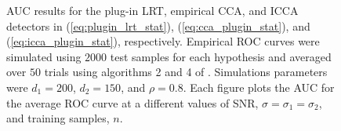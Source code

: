 \begin{figure}
{    \label{fig:auc_icca_high_rho}
  }
  \caption{AUC results for the plug-in LRT, empirical CCA, and ICCA detectors in
    (\ref{eq:plugin_lrt_stat}), (\ref{eq:cca_plugin_stat}), and
    (\ref{eq:icca_plugin_stat}), respectively. Empirical ROC curves were simulated using
    $2000$ test samples for each hypothesis and averaged over $50$ trials using
    algorithms 2 and 4 of \cite{fawcett2006introduction}. Simulations parameters were
    $d_1=200$, $d_2=150$, and $\rho=0.8$. Each figure plots the AUC for the average ROC curve
    at a different values of SNR, $\sigma=\sigma_1=\sigma_2$, and training samples, $n$.}
  \label{fig:auc_high_rho}
\end{figure}

